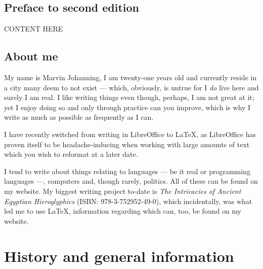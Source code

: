 \documentclass[a5paper,twoside,11pt]{report}
\begin{document}
\tableofcontents
\newpage

\chapter*{Preface to second edition}
	CONTENT HERE

	\newpage

	\chapter*{About me}

		My name is Marvin Johanning, I am twenty-one years old and currently reside in a city many deem to not exist — which, obviously, is untrue for I \textit{do} live here and surely I am real. I like writing things even though, perhaps, I am not great at it; yet I enjoy doing so and only through practice can you improve, which is why I write as much as possible as frequently as I can.

		I have recently switched from writing in LibreOffice to \LaTeX, as LibreOffice has proven itself to be headache-inducing when working with large amounts of text which you wish to reformat at a later date. 

		I tend to write about things relating to languages — be it real or programming languages —, computers and, though rarely, politics. All of these can be found on my website. My biggest writing project to-date is \textit{The Intricacies of Ancient Egyptian Hieroglyphics} (ISBN: 978-3-752952-49-0), which incidentally, was what led me to use \LaTeX, information regarding which can, too, be found on my website.
		\newpage


\thispagestyle{empty}
  \mbox{}
  \newpage

\part*{History and general information}
  \newpage
\end{document}
